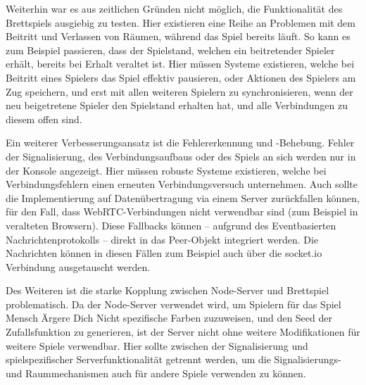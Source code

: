 Weiterhin war es aus zeitlichen Gründen nicht möglich, die Funktionalität des Brettspiels ausgiebig zu testen. Hier existieren eine Reihe an Problemen mit dem Beitritt und Verlassen von Räumen, während das Spiel bereits läuft. So kann es zum Beispiel passieren, dass der Spielstand, welchen ein beitretender Spieler erhält, bereits bei Erhalt veraltet ist. Hier müssen Systeme existieren, welche bei Beitritt eines Spielers das Spiel effektiv pausieren, oder Aktionen des Spielers am Zug speichern, und erst mit allen weiteren Spielern zu synchronisieren, wenn der neu beigetretene Spieler den Spielstand erhalten hat, und alle Verbindungen zu diesem offen sind.\par

Ein weiterer Verbesserungsansatz ist die Fehlererkennung und -Behebung. Fehler der Signalisierung, des Verbindungsaufbaus oder des Spiels an sich werden nur in der Konsole angezeigt. Hier müssen robuste Systeme existieren, welche bei Verbindungsfehlern einen erneuten Verbindungsversuch unternehmen. Auch sollte die Implementierung auf Datenübertragung via einem Server zurückfallen können, für den Fall, dass WebRTC-Verbindungen nicht verwendbar sind (zum Beispiel in veralteten Browsern). Diese Fallbacks können -- aufgrund des Eventbasierten Nachrichtenprotokolls -- direkt in das Peer-Objekt integriert werden. Die Nachrichten können in diesen Fällen zum Beispiel auch über die socket.io Verbindung ausgetauscht werden.\par

Des Weiteren ist die starke Kopplung zwischen Node-Server und Brettspiel problematisch. Da der Node-Server verwendet wird, um Spielern für das Spiel \glqq{}Mensch Ärgere Dich Nicht\grqq{} spezifische Farben zuzuweisen, und den Seed der Zufallsfunktion zu generieren, ist der Server nicht ohne weitere Modifikationen für weitere Spiele verwendbar. Hier sollte zwischen der Signalisierung und spielspezifischer Serverfunktionalität getrennt werden, um die Signalisierungs- und Raummechanismen auch für andere Spiele verwenden zu können.\par


